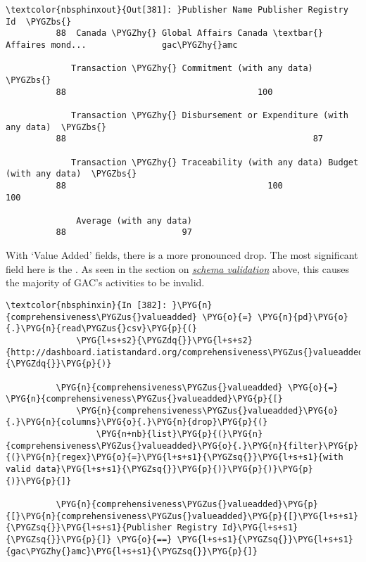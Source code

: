 \documentclass[letterpaper,10pt,english]{sphinxmanual}
\begin{document}
\begin{Verbatim}[commandchars=\\\{\}]
\textcolor{nbsphinxout}{Out[381]: }Publisher Name Publisher Registry Id  \PYGZbs{}
          88  Canada \PYGZhy{} Global Affairs Canada \textbar{} Affaires mond...               gac\PYGZhy{}amc
          
             Transaction \PYGZhy{} Commitment (with any data)  \PYGZbs{}
          88                                      100
          
             Transaction \PYGZhy{} Disbursement or Expenditure (with any data)  \PYGZbs{}
          88                                                 87
          
             Transaction \PYGZhy{} Traceability (with any data) Budget (with any data)  \PYGZbs{}
          88                                        100                    100
          
              Average (with any data)
          88                       97
\end{Verbatim}

With `Value Added' fields, there is a more pronounced drop. The most
significant field here is the . As seen in the
section on {\hyperref[\detokenize{Global Affairs Canada - Compliance Report:Schema-Valdation}]{\emph{schema validation}}} above, this causes
the majority of GAC's activities to be invalid.

\begin{Verbatim}[commandchars=\\\{\}]
\textcolor{nbsphinxin}{In [382]: }\PYG{n}{comprehensiveness\PYGZus{}valueadded} \PYG{o}{=} \PYG{n}{pd}\PYG{o}{.}\PYG{n}{read\PYGZus{}csv}\PYG{p}{(}
              \PYG{l+s+s2}{\PYGZdq{}}\PYG{l+s+s2}{http://dashboard.iatistandard.org/comprehensiveness\PYGZus{}valueadded.csv}\PYG{l+s+s2}{\PYGZdq{}}\PYG{p}{)}
          
          \PYG{n}{comprehensiveness\PYGZus{}valueadded} \PYG{o}{=} \PYG{n}{comprehensiveness\PYGZus{}valueadded}\PYG{p}{[}
              \PYG{n}{comprehensiveness\PYGZus{}valueadded}\PYG{o}{.}\PYG{n}{columns}\PYG{o}{.}\PYG{n}{drop}\PYG{p}{(}
                  \PYG{n+nb}{list}\PYG{p}{(}\PYG{n}{comprehensiveness\PYGZus{}valueadded}\PYG{o}{.}\PYG{n}{filter}\PYG{p}{(}\PYG{n}{regex}\PYG{o}{=}\PYG{l+s+s1}{\PYGZsq{}}\PYG{l+s+s1}{with valid data}\PYG{l+s+s1}{\PYGZsq{}}\PYG{p}{)}\PYG{p}{)}\PYG{p}{)}\PYG{p}{]}
          
          \PYG{n}{comprehensiveness\PYGZus{}valueadded}\PYG{p}{[}\PYG{n}{comprehensiveness\PYGZus{}valueadded}\PYG{p}{[}\PYG{l+s+s1}{\PYGZsq{}}\PYG{l+s+s1}{Publisher Registry Id}\PYG{l+s+s1}{\PYGZsq{}}\PYG{p}{]} \PYG{o}{==} \PYG{l+s+s1}{\PYGZsq{}}\PYG{l+s+s1}{gac\PYGZhy{}amc}\PYG{l+s+s1}{\PYGZsq{}}\PYG{p}{]}
\end{Verbatim}
\end{document}
